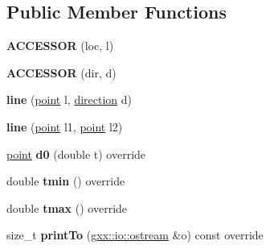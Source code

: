 \subsection*{Public Member Functions}
\begin{DoxyCompactItemize}
\item 
{\bfseries A\+C\+C\+E\+S\+S\+OR} (loc, l)\hypertarget{classgxx_1_1curve3_1_1line_a1ec94798b9efa81942915b0102aa3e0a}{}\label{classgxx_1_1curve3_1_1line_a1ec94798b9efa81942915b0102aa3e0a}

\item 
{\bfseries A\+C\+C\+E\+S\+S\+OR} (dir, d)\hypertarget{classgxx_1_1curve3_1_1line_ad53840b1f5abb3e4268d0608aeb6c220}{}\label{classgxx_1_1curve3_1_1line_ad53840b1f5abb3e4268d0608aeb6c220}

\item 
{\bfseries line} (\hyperlink{classgxx_1_1geom3_1_1point}{point} l, \hyperlink{classgxx_1_1geom3_1_1direction}{direction} d)\hypertarget{classgxx_1_1curve3_1_1line_affa66b223b6e57701a8d1c7cd0e0524d}{}\label{classgxx_1_1curve3_1_1line_affa66b223b6e57701a8d1c7cd0e0524d}

\item 
{\bfseries line} (\hyperlink{classgxx_1_1geom3_1_1point}{point} l1, \hyperlink{classgxx_1_1geom3_1_1point}{point} l2)\hypertarget{classgxx_1_1curve3_1_1line_ae2d76333ac4c3efbd1cbb59148359b4d}{}\label{classgxx_1_1curve3_1_1line_ae2d76333ac4c3efbd1cbb59148359b4d}

\item 
\hyperlink{classgxx_1_1geom3_1_1point}{point} {\bfseries d0} (double t) override\hypertarget{classgxx_1_1curve3_1_1line_a2ce5a22ed3b09aed447629135a938879}{}\label{classgxx_1_1curve3_1_1line_a2ce5a22ed3b09aed447629135a938879}

\item 
double {\bfseries tmin} () override\hypertarget{classgxx_1_1curve3_1_1line_a32fd55f7aeee4576727187fab6026286}{}\label{classgxx_1_1curve3_1_1line_a32fd55f7aeee4576727187fab6026286}

\item 
double {\bfseries tmax} () override\hypertarget{classgxx_1_1curve3_1_1line_adc409ec7fa49a399399dc7043944a7e7}{}\label{classgxx_1_1curve3_1_1line_adc409ec7fa49a399399dc7043944a7e7}

\item 
size\+\_\+t {\bfseries print\+To} (\hyperlink{classgxx_1_1io_1_1ostream}{gxx\+::io\+::ostream} \&o) const override\hypertarget{classgxx_1_1curve3_1_1line_a5a84dce8c9ed17fc944ebc9b9ff81cc4}{}\label{classgxx_1_1curve3_1_1line_a5a84dce8c9ed17fc944ebc9b9ff81cc4}

\end{DoxyCompactItemize}
